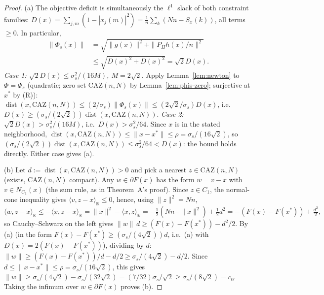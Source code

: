 \documentclass[11pt]{article}
\theoremstyle{plain}
\theoremstyle{definition}
\theoremstyle{remark}
\newcommand{\R}{\mathbb R}
\newcommand{\CAZ}{\mathrm{CAZ}}
\newcommand{\dist}{\operatorname{dist}}
\begin{document}
\begin{proof}
(a) The objective deficit is simultaneously the $\ell^1$ slack of both
constraint families:
$D(x)=\sum_{j,m}(1-|x_j(m)|^2)=\tfrac1n\sum_k(Nn-S_x(k))$, all terms
$\ge0$. In particular,
\begin{align*}
\|\Phi_s(x)\|
 &=\sqrt{\|g(x)\|^2+\|P_Hh(x)/n\|^2}\\
 &\le\sqrt{D(x)^2+D(x)^2}=\sqrt2D(x).
\end{align*}
\emph{Case 1: $\sqrt2D(x)\le\sigma_s^2/(16M)$, $M=2\sqrt2$.} Apply
Lemma~\ref{lem:newton} to $\Phi=\Phi_s$ (quadratic; zero set $\CAZ(n,N)$ by
Lemma~\ref{lem:phis-zero}; surjective at $x^*$ by (R)):
$\dist(x,\CAZ(n,N))\le(2/\sigma_s)\|\Phi_s(x)\|\le(2\sqrt2/\sigma_s)D(x)$,
i.e.\ $D(x)\ge(\sigma_s/(2\sqrt2))\dist(x,\CAZ(n,N))$.
\emph{Case 2: $\sqrt2D(x)>\sigma_s^2/(16M)$}, i.e.\ $D(x)>\sigma_s^2/64$.
Since $x$ is in the stated neighborhood, $\dist(x,\CAZ(n,N))\le\|x-x^*\|\le\rho=\sigma_s/(16\sqrt2)$,
so $(\sigma_s/(2\sqrt2))\dist(x,\CAZ(n,N))\le\sigma_s^2/64<D(x)$: the bound
holds directly. Either case gives (a).

(b) Let $d:=\dist(x,\CAZ(n,N))>0$ and pick a nearest $z\in\CAZ(n,N)$
(exists, $\CAZ(n,N)$ compact). Any $w\in\partial F(x)$ has the form
$w=v-x$ with $v\in N_{C_1}(x)$ (the sum rule, as in Theorem~A's proof).
Since $z\in C_1$, the normal-cone inequality gives $\langle v,z-x\rangle_\R\le0$,
hence, using $\|z\|^2=Nn$,
$$\langle w,z-x\rangle_\R\le-\langle x,z-x\rangle_\R=\|x\|^2-\langle x,z\rangle_\R
=-\tfrac12(Nn-\|x\|^2)+\tfrac12d^2=-(F(x)-F(x^*))+\tfrac{d^2}2,$$
so Cauchy--Schwarz on the left gives $\|w\|\,d\ge(F(x)-F(x^*))-d^2/2$.
By (a) (in the form $F(x)-F(x^*)\ge(\sigma_s/(4\sqrt2))d$, i.e.\ (a) with
$D(x)=2(F(x)-F(x^*))$), dividing by $d$:
$\|w\|\ge(F(x)-F(x^*))/d-d/2\ge\sigma_s/(4\sqrt2)-d/2$. Since
$d\le\|x-x^*\|\le\rho=\sigma_s/(16\sqrt2)$, this gives
$\|w\|\ge\sigma_s/(4\sqrt2)-\sigma_s/(32\sqrt2)=(7/32)\sigma_s/\sqrt2\ge\sigma_s/(8\sqrt2)=c_0$.
Taking the infimum over $w\in\partial F(x)$ proves (b).


\end{proof}
\end{document}
